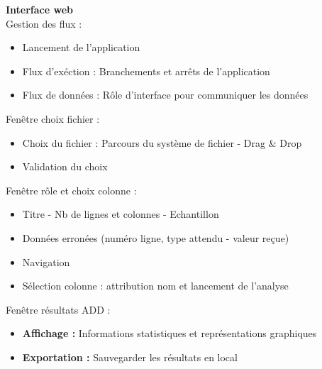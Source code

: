 	\begin{frame}
		\textbf{Interface web}\\
		Gestion des flux :
		\begin{itemize}
			\item Lancement de l'application
			\item Flux d'exéction : Branchements et arrêts de l'application
			\item Flux de données : Rôle d'interface pour communiquer les données
		\end{itemize} \pause
		
		Fenêtre choix fichier :
		\begin{itemize}
			\item Choix du fichier : Parcours du système de fichier - Drag & Drop
			\item Validation du choix
		\end{itemize} \pause
		
		Fenêtre rôle et choix colonne :
		\begin{itemize}
			\item Titre - Nb de lignes et colonnes - Echantillon
			\item Données erronées (numéro ligne, type attendu - valeur reçue)
			\item Navigation
			\item Sélection colonne : attribution nom et lancement de l'analyse
		\end{itemize} \pause
		
		Fenêtre résultats ADD :
		\begin{itemize}
			\item \textbf{Affichage :} Informations statistiques et représentations graphiques
			\item \textbf{Exportation :} Sauvegarder les résultats en local
		\end{itemize}
	\end{frame}
	
